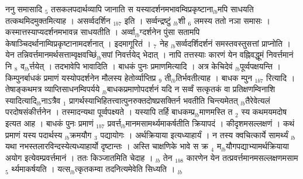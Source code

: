 \documentclass[article,12pt,a4paper]{memoir}%
\newcounter{parCount}
\begin{document}
	  
	  \pstart \leavevmode%
	ननु समासादि {\tiny $_{5}$} तसकलपदार्थव्यापि जानाति स यस्यादर्शनमभावम्विप्रकृष्टाना{\tiny $_{lb}$}मपि साधयति तत्कथमिदमुक्तमित्याह । {\color{DodgerBlue3}असर्व्वदर्शिन} {\tiny $_{1b7}$} इति । सर्व्वन्द्रष्टुं {\tiny $_{lb}$}शी {\tiny $_{6}$} लमस्य ततो नञा समासः । कस्मात्तस्याप्यदर्शनमभावन्न साधयतीति । अर्व्वा{\tiny $_{lb}$}ग्दर्शनेन पुंसा सतामपि केषाञ्चिदर्थानाम्विप्रकृष्टानामदर्शनात् । इदमागूरितं । {\tiny $_{7}$} नेह {\tiny $_{lb}$}सर्व्वदर्शिदर्शनं समस्तवस्तुसत्तां प्राप्नोति । येन तन्निवर्त्तमानमर्थसत्ताम्वृक्षवच्छिं{\tiny $_{lb}$}सपां निवर्त्तयेद् भेदात् । नापि तत्तस्याः कारणं येन वह्निवद्धूमं निवर्त्तमानं नि {\tiny $_{8}$} व{\tiny $_{lb}$}र्त्तयेत् । तदभावेपि भावादिति । बाधकं पुनः प्रमाणमित्यादि । अत्र केचिदेवं {\tiny $_{lb}$}पूर्व्वपक्षयन्ति । किम्पुनर्बाधकं प्रमाणं यस्योपदर्शनेन मौलस्य हेतोर्व्याप्तिप्र {\tiny $_{9}$} \leavevmode{} ती{\tiny $_{lb}$}तिर्भवतीत्याह । {\color{DodgerBlue3}बाधक} म्पुन {\tiny $_{1b7}$} रित्यादि । तेषाङ्कथमत्र व्याप्तिसाधनम्विपर्यये {\tiny $_{lb}$}बाधकप्रमाणोपदर्शनं यदि न सर्व्वं सत्कृतकं वा प्रतिक्षणम्विनाशि स्यादित्यादि{\tiny $_{lb}$}नाऽत्रैव {\tiny $_{1}$} प्रागर्थस्याभिहितत्त्वात्पुनरुक्तदोषप्रसक्तिर्न भवतीति चिन्त्यमेतत् {\tiny $_{lb}$}तैरेवेत्यलं परदोषसंकीर्त्तनेन । तस्मादन्यथा पूर्व्वपक्ष्यते । यस्यापि तर्हि बाधकम्प्र{\tiny $_{lb}$}माणमस्ति त {\tiny $_{2}$} स्य कथमयमदोष इत्यत आह । {\color{DodgerBlue3}बाधकं पुनः प्रमाणं} {\tiny $_{1b7}$} प्रवर्त्त{\tiny $_{lb}$}मानमसामर्थ्यमाकर्षतीति क्रियापदं । कीदृशमसल्लक्षणं । कथं प्रमाणं यस्य पदार्थस्य {\tiny $_{lb}$}क्रमयौग {\tiny $_{3}$} पद्यायोगः । अर्थक्रियाया इत्यध्याहार्यं । न तस्य क्वचित्कार्ये सामर्थ्यं {\tiny $_{lb}$}यथा नभस्तलारविन्दस्येत्यध्याहार्यो दृष्टान्तः । अस्ति चाक्षणिके भावे स क्र {\tiny $_{4}$} म{\tiny $_{lb}$}यौगपद्याभ्यामर्थक्रियाया अयोग इत्येवम्प्रवर्त्तमानं । ततः किञ्जातमिति चेदाह । {\tiny $_{lb}$} {\color{DodgerBlue3}तेन} {\tiny $_{1b8}$} कारणेन येन तत्प्रवर्त्तमानमसल्लक्षणमसाम {\tiny $_{5}$} र्थ्यमाकर्षयति । यत्स{\tiny $_{lb}$}त्कृतकम्वा तदनित्यमेवेति सिध्यति ।
	{}
	\pend%
      {\tiny $_{lb}$}
\end{document}
